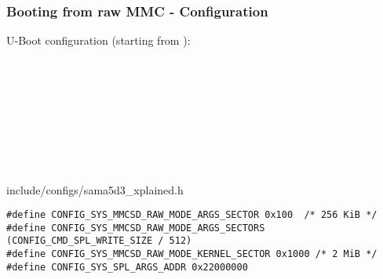 \begin{frame}[fragile]
\frametitle{Booting from raw MMC - Configuration}
        \small
        U-Boot configuration (starting from
        ):\\
        \\
        \\
        \\
        \\
        \\
        \\
        \\
        \\
        \begin{block}{include/configs/sama5d3\_xplained.h}
        \begin{verbatim}
#define CONFIG_SYS_MMCSD_RAW_MODE_ARGS_SECTOR 0x100  /* 256 KiB */
#define CONFIG_SYS_MMCSD_RAW_MODE_ARGS_SECTORS (CONFIG_CMD_SPL_WRITE_SIZE / 512)
#define CONFIG_SYS_MMCSD_RAW_MODE_KERNEL_SECTOR 0x1000 /* 2 MiB */
#define CONFIG_SYS_SPL_ARGS_ADDR 0x22000000
        \end{verbatim}
        \end{block}
\end{frame}

